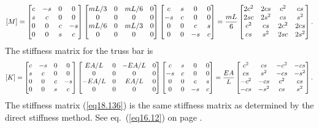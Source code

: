 \documentclass{AeroStructure-ERJohnson}
\begin{document}
\begin{align}\label{eq18.135}
[M]=\left[\begin{array}{@{}cccc@{}}c & -s & 0 & 0 \\s & c & 0 & 0 \\0 & 0 & c & -s \\0 & 0 & s & c\end{array}\right]\left[\begin{array}{@{}cccc@{}}m L/3 & 0 & m L/6 & 0 \\0 & 0 & 0 & 0 \\m L/6 & 0 & m L/3 & 0 \\0 & 0 & 0 & 0\end{array}\right]\left[\begin{array}{@{}cccc@{}}c & s & 0 & 0 \\-s & c & 0 & 0 \\0 & 0 & c & s \\0 & 0 & -s & c\end{array}\right]=\frac{m L}{6}\left[\begin{array}{@{}cccc@{}}2 c^{2} & 2 c s & c^{2} & c s \\2 s c & 2 s^{2} & c s & s^{2} \\c^{2} & c s & 2 c^{2} & 2 c s \\c s & s^{2} & 2 s c & 2 s^{2}\end{array}\right].
\end{align}
The stiffness matrix for the truss bar is
\begin{align}\label{eq18.136}
[K]=\left[\begin{array}{@{}cccc@{}}c & -s & 0 & 0 \\s & c & 0 & 0 \\0 & 0 & c & -s \\0 & 0 & s & c\end{array}\right]\left[\begin{array}{@{}cccc@{}}E A/L & 0 & -E A/L & 0 \\0 & 0 & 0 & 0 \\-E A/L & 0 & E A/L & 0 \\0 & 0 & 0 & 0\end{array}\right]\left[\begin{array}{@{}cccc@{}}c & s & 0 & 0 \\-s & c & 0 & 0 \\0 & 0 & c & s \\0 & 0 & -s & c\end{array}\right]=\frac{E A}{L}\left[\begin{array}{@{}cccc@{}}c^{2} & c s & -c^{2} & -c s \\c s & s^{2} & -c s & -s^{2} \\-c^{2} & -c s & c^{2} & c s \\-c s & -s^{2} & c s & s^{2}\end{array}\right].
\end{align}
The stiffness matrix (\ref{eq18.136}) is the same stiffness matrix as determined by the direct stiffness method. See eq.~(\ref{eq16.12}) on page \pageref{eq16.12}.
\end{document}
